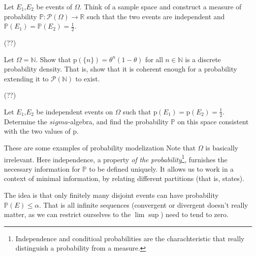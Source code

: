 \begin{my_ex}
	Let $E_1$,$E_2$ be events of $\Omega$. Think of a sample space and construct a measure of probability $\mathbb{P} : \mathcal{P}(\Omega) \to \mathbb{R}$ such that the two events are independent and $\mathbb{P}(E_1)=\mathbb{P}(E_2)=\frac{1}{2}$.
\end{my_ex}
\begin{my_notes}
	(??) %
\end{my_notes}

\begin{my_ex}
	Let $\Omega=\mathbb{N}$. Show that $\mathrm{p}(\{n\})=\theta^n(1-\theta)$ for all $n\in\mathbb{N}$ is a discrete probability density. That is, show that it is coherent enough for a probability extending it to $\mathcal{P}(\mathbb{N})$ to exist.  
\end{my_ex}
\begin{my_notes}
	(??)
\end{my_notes}

\begin{my_ex}
	Let $E_1$,$E_2$ be independent events on $\Omega$ such that $\mathrm{p}(E_1)=\mathrm{p}(E_2)=\frac{1}{2}$. Determine the $sigma$-algebra, and find the probability $\mathbb{P}$ on this space consistent with the two values of $\mathrm{p}$.
\end{my_ex}
\begin{my_ex}
\end{my_ex}
\begin{my_remark}
	These are some examples of probability modelization Note that $\Omega$ is basically irrelevant. Here independence, a property \textit{of the probability}\footnote{Independence and conditioal probabilities are the charachteristic that really distinguish a probability from a measure.}, furnishes the necessary information for $\mathbb{P}$ to be defined uniquely. It allows us to work in a context of minimal information, by relating different partitions (that is, states).
\end{my_remark}

\begin{my_ex}
	\label{ex_jp_7_1}
	
\end{my_ex}
\begin{my_remark}
	The idea is that only finitely many disjoint events can have probability $\mathbb{P}(E) \leq \alpha$. That is all infinite sequences (convergent or divergent doesn't really matter, as we can restrict ourselves to the $\lim \sup$) need to tend to zero.
\end{my_remark}

